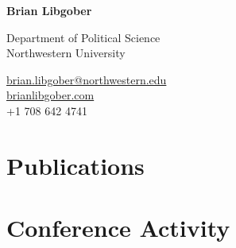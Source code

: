 \documentclass[12pt,letterpaper]{report}
\newcommand{\myname}{Brian Libgober}
\newcommand{\namefont}[1]{{\normalfont\bfseries\Huge{#1}}}
\begin{document}
	\pagestyle{fancy}
	\fancyhf{}
	\renewcommand{\headrulewidth}{0pt}
    \raggedright{}

    \begin{minipage}[t]{0.6\textwidth}
	\raggedright{}
    \namefont{\myname}
	\end{minipage}
	\hfill
    \vspace{1em}
    \begin{minipage}[t]{0.6\textwidth}
        \flushleft{} Department of Political Science \\
         Northwestern University
    \end{minipage}
    \hfill
    \begin{minipage}[t]{0.395\textwidth}
        \flushright{}
        \href{mailto:brian.libgober@northwestern.edu}{brian.libgober@northwestern.edu} \\
        \href{https://brianlibgober.com}{brianlibgober.com} \\
         +1 708 642 4741 \\
    \end{minipage}
    



\section*{Publications}











\section*{Conference Activity}
\end{document}

